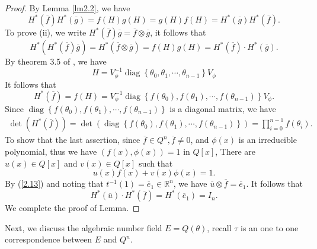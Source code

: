 \documentclass [11pt]{article}
\begin{document}
\begin{proof}
By Lemma \ref{lm2.2}, we have
$$
H^{*}(\overline{f})  H^{*}(\overline{g})=f(H) g(H)=g(H) f(H)=H^{*}(\overline{g})  H^{*}(\overline{f}) .
$$
To  prove (ii), we write $H^{*}(\overline{f}) \overline{g}=\overline{f} \otimes \overline{g}$, it follows that
$$
H^{*}\left(H^{*}(\overline{f}) \overline{g}\right)=H^{*}(\overline{f} \otimes \overline{g})=f(H) g(H)=H^{*}(\overline{f}) \cdot H^{*} ( \overline{g}).
$$
By theorem 3.5 of \cite{D-a}, we have
\begin{equation}\label{2.15}
H=V_{\phi}^{-1} \operatorname{diag}\left\{\theta_{0}, \theta_{1}, \cdots, \theta_{n- 1}\right\} V_{\phi}
\end{equation}
It follows that
$$
H^{*}(\overline{f})=f(H)=V^{-1} _{\phi}\operatorname{diag}\left\{f\left(\theta_{0}\right), f\left(\theta_{1}\right), \cdots, f\left(\theta_{n-1}\right) \right\}  V_{\phi}.
$$
Since $\operatorname{diag}\left\{f\left(\theta_{0}\right), f\left(\theta_{1}\right), \cdots ,f\left(\theta_{n-1}\right)\right\}$ is a diagonal matrix, we have
$$
\begin{aligned}
\operatorname{det}\left(H^{*}(\overline{f})\right) =\operatorname{det}\left(\operatorname{diag}\left\{f\left(\theta_{0}\right), f\left(\theta_{1}\right), \cdots, f\left(\theta_{n-1}\right)\right\}\right) =\prod_{i=0}^{n-1} f\left(\theta_{i}\right) .
\end{aligned}
$$
To show that the last assertion, since $\overline{f} \in Q^{n}, \overline{f} \neq 0$, and $\phi(x)$ is an irreducible polynomial, thus we have $(f(x), \phi(x))=1$ in $Q[x]$, There are $u(x) \in Q[x]$ and $v(x) \in Q[x]$ such that
$$
u(x) f(x)+v(x) \phi(x)=1.
$$
By (\ref{2.13}) and noting that $t^{-1}(1)=\overline{e}_{1} \in \mathbb{R}^{n}$, we have $\overline{u} \otimes \overline{f}=\overline{e}_{1}$. It follows that
$$
H^{*}(\overline{u}) \cdot H^{*}(\overline{f})=H^{*}(\overline{e}_{1})=I_{n} .
$$
We complete the proof of Lemma.
\end{proof}

Next, we discuss the algebraic number field $E=Q(\theta)$, recall $\tau$ is an one to one correspondence between $E$ and $Q^{n}$.
\end{document}
